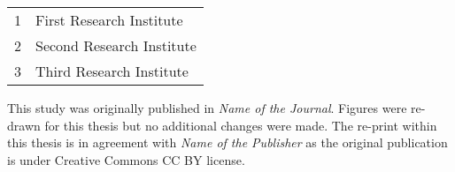 \noindent\begin{tabular}{L{.015\textwidth}L{.985\textwidth}}
    1 & First Research Institute \\
    2 & Second Research Institute \\
    3 & Third Research Institute
\end{tabular}

\noindent\colorbox{clrt1!15}{\parbox{\textwidth}{
This study was originally published in \textit{Name of the Journal}.
Figures were re-drawn for this thesis but no additional changes were made.
The re-print within this thesis is in agreement with \textit{Name of the Publisher} as the original publication is under Creative Commons CC BY license.

}}


